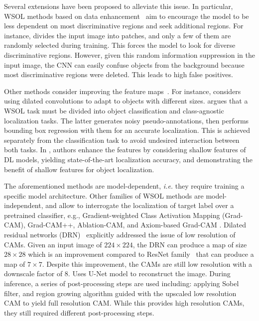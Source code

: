 \documentclass[twocolumn]{article}
\makeatletter
\theoremstyle{definition}
\newcommand*{\ie}{\emph{i.e.}\@\xspace}
\makeatother
\begin{document}
Several extensions have been proposed to alleviate this issue. In particular, WSOL methods based on data enhancement~\cite{ChoeS19,SinghL17, WeiFLCZY17,YunHCOYC19, ZhangWF0H18} aim to encourage the model to be less dependent on most discriminative regions and seek additional regions. For instance, \cite{SinghL17} divides the input image into patches, and only a few of them are randomly selected during training. This forces the model to look for diverse discriminative regions. However, given this random information suppression in the input image, the CNN can easily confuse objects from the background because most discriminative regions were deleted. This leads to high false positives.

Other methods consider improving the feature maps~\cite{LeeKLLY19,RahimiSAHB20,wei2021shallowspol,WeiXSJFH18,XueLWJJY19iccvdanet,YangKKK20,ZhangCW20,ZhangWKYH18}. For instance, \cite{WeiXSJFH18} considers using dilated convolutions to adapt to objects with different sizes. \cite{ZhangCW20} argues that a WSOL task must be divided into object classification and class-agnostic localization tasks. The latter generates noisy pseudo-annotations, then performs bounding box regression with them for an accurate localization. This is achieved separately from the classification task to avoid undesired interaction between both tasks. In \cite{wei2021shallowspol}, authors enhance the features by considering shallow features of DL models, yielding state-of-the-art localization accuracy, and demonstrating the benefit of shallow features for object localization.

The aforementioned methods are model-dependent, \ie they require training a specific model architecture. Other families of WSOL methods are model-independent, and allow to interrogate the localization of target label over a pretrained classifier, e.g., Gradient-weighted Class Activation Mapping (Grad-CAM), Grad-CAM++, Ablation-CAM, and Axiom-based Grad-CAM \cite{fu2020axiom, lin2013network, PinheiroC15cvpr}. Dilated residual networks (DRN)~\cite{YuKF17} explicitly addressed the issue of low resolution of CAMs. Given an input image of ${224\times224}$, the DRN can produce a map of size ${28\times28}$ which is an improvement compared to ResNet family~\cite{heZRS16} that can produce a map of ${7\times7}$. Despite this improvement, the CAMs are still low resolution with a downscale factor of 8. \cite{TagarisSS19} Uses U-Net model to reconstruct the image. During inference, a series of post-processing steps are used including: applying Sobel filter, and region growing algorithm guided with the upscaled low resolution CAM to yield full resolution CAM. While this provides high resolution CAMs, they still required different post-processing steps.
\end{document}
